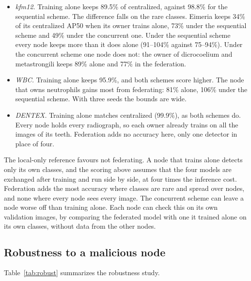 \documentclass[pdflatex,sn-mathphys-num]{sn-jnl}
\begin{document}
\begin{itemize}
\item \emph{kfm12.} Training alone keeps 89.5\% of centralized, against 98.8\% for the sequential scheme. The difference falls on the rare classes. Eimeria keeps 34\% of its centralized AP50 when its owner trains alone, 73\% under the sequential scheme and 49\% under the concurrent one. Under the sequential scheme every node keeps more than it does alone (91--104\% against 75--94\%). Under the concurrent scheme one node does not: the owner of dicrocoelium and metastrongili keeps 89\% alone and 77\% in the federation.
\item \emph{WBC.} Training alone keeps 95.9\%, and both schemes score higher. The node that owns neutrophils gains most from federating: 81\% alone, 106\% under the sequential scheme. With three seeds the bounds are wide.
\item \emph{DENTEX.} Training alone matches centralized (99.9\%), as both schemes do. Every node holds every radiograph, so each owner already trains on all the images of its teeth. Federation adds no accuracy here, only one detector in place of four.
\end{itemize}
The local-only reference favours not federating. A node that trains alone detects only its own classes, and the scoring above assumes that the four models are exchanged after training and run side by side, at four times the inference cost. Federation adds the most accuracy where classes are rare and spread over nodes, and none where every node sees every image. The concurrent scheme can leave a node worse off than training alone. Each node can check this on its own validation images, by comparing the federated model with one it trained alone on its own classes, without data from the other nodes.

\subsection{Robustness to a malicious node}\label{sec:res-robust}
Table~\ref{tab:robust} summarizes the robustness study.
\end{document}
